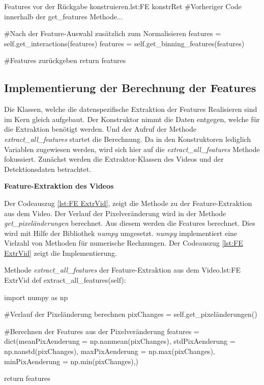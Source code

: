 \begin{pythoncode}{Features vor der Rückgabe konstruieren.}{lst:FE konstrRet}
#Vorheriger Code innerhalb der get_features Methode...

#Nach der Feature-Auswahl zusätzlich zum Normalisieren
features = self.get_interactions(features)
features = self.get_binning_features(features)

#Features zurückgeben
return features
\end{pythoncode}



\subsection{Implementierung der Berechnung der Features} \label{sec:Umsetz SubExtrak}
Die Klassen, welche die datenspezifische Extraktion der Features Realisieren sind im Kern gleich aufgebaut. Der Konstruktor nimmt die Daten entgegen, welche für die Extraktion benötigt werden. Und der Aufruf der Methode \textit{extract\_all\_features} startet die Berechnung. Da in den Konstruktoren lediglich Variablen zugewiesen werden, wird sich hier auf die \textit{extract\_all\_features} Methode fokussiert. Zunächst werden die Extraktor-Klassen des Videos und der Detektionsdaten betrachtet. \dubpar

\textbf{Feature-Extraktion des Videos}\par

Der Codeauszug \ref{lst:FE ExtrVid}, zeigt die Methode zu der Feature-Extraktion aus dem Video. Der Verlauf der Pixelveränderung wird in der Methode \textit{get\_pixeländerungen} berechnet. Aus diesem werden die Features berechnet. Dies wird mit Hilfe der Bibliothek \textit{numpy} umgesetzt. \textit{numpy} implementiert eine Vielzahl von Methoden für numerische Rechnungen. Der Codeauszug \ref{lst:FE ExtrVid} zeigt die Implementierung.

\begin{pythoncode}{Methode \textit{extract\_all\_features} der Feature-Extraktion aus dem Video.}{lst:FE ExtrVid}
def extract_all_features(self):

    import numpy as np
        
    #Verlauf der Pixeländerung berechnen 
    pixChanges = self.get_pixeländerungen()

    #Berechnen der Features aus der Pixelveränderung
    features = dict(meanPixAenderung = np.nanmean(pixChanges),
                    stdPixAenderung = np.nanstd(pixChanges),
                    maxPixAenderung = np.max(pixChanges),
                    minPixAenderung = np.min(pixChanges),)
    
    return features

\end{pythoncode}

